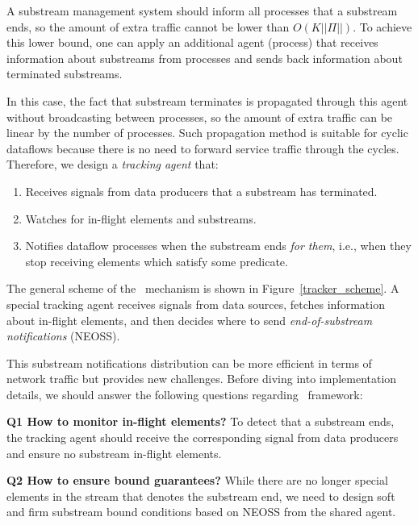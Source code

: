 \label{fs-acker-tracker}


A substream management system should inform all processes that a substream ends, so the amount of extra traffic cannot be lower than $O(K||\Pi||)$. To achieve this lower bound, one can apply an additional agent (process) that receives information about substreams from processes and sends back information about terminated substreams. 

In this case, the fact that substream terminates is propagated through this agent without broadcasting between processes, so the amount of extra traffic can be linear by the number of processes. Such propagation method is suitable for cyclic dataflows because there is no need to forward service traffic through the cycles. Therefore, we design a {\em tracking agent} that:

\begin{enumerate}
    \item Receives signals from data producers that a substream has terminated.
    \item Watches for in-flight elements and substreams.
    \item Notifies dataflow processes when the substream ends {\em for them}, i.e., when they stop receiving elements which satisfy some predicate.
\end{enumerate}

The general scheme of the \tracker\ mechanism is shown in Figure~\ref{tracker_scheme}. A special tracking agent receives signals from data sources, fetches information about in-flight elements, and then decides where to send {\em end-of-substream notifications} (NEOSS).

This substream notifications distribution can be more efficient in terms of network traffic but provides new challenges. Before diving into implementation details, we should answer the following questions regarding \tracker\ framework:

{\bf Q1 How to monitor in-flight elements?} To detect that a substream ends, the tracking agent should receive the corresponding signal from data producers and ensure no substream in-flight elements. 

{\bf Q2 How to ensure bound guarantees?} While there are no longer special elements in the stream that denotes the substream end, we need to design soft and firm substream bound conditions based on NEOSS from the shared agent. 


